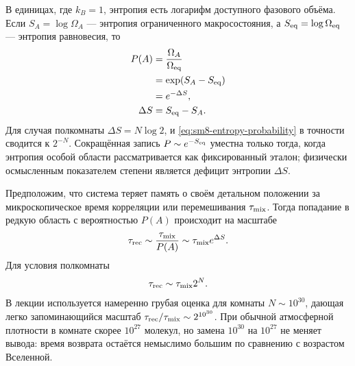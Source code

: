 В единицах, где \(k_B=1\), энтропия есть логарифм доступного фазового объёма. Если \(S_A=\log\Omega_A\) — энтропия ограниченного макросостояния, а \(S_{\rm eq}=\log\Omega_{\rm eq}\) — энтропия равновесия, то
\begin{equation}
 \begin{aligned}
 P(A)
 &=\frac{\Omega_A}{\Omega_{\rm eq}}\\
 &=\exp\!\left(S_A-S_{\rm eq}\right)\\
 &=e^{-\Delta S},\\
 \Delta S&=S_{\rm eq}-S_A.
 \end{aligned}
 \label{eq:sm8-entropy-probability}
\end{equation}
Для случая полкомнаты \(\Delta S=N\log 2\), и
\eqref{eq:sm8-entropy-probability} в точности сводится к \(2^{-N}\).
Сокращённая запись \(P\sim e^{-S_{\rm eq}}\) уместна только тогда, когда энтропия особой области рассматривается как фиксированный эталон; физически осмысленным показателем степени является дефицит энтропии \(\Delta S\).

\begin{classroomqa}
\end{classroomqa}

Предположим, что система теряет память о своём детальном положении за микроскопическое время корреляции или перемешивания \(\tau_{\rm mix}\). Тогда попадание в редкую область с вероятностью \(P(A)\) происходит на масштабе
\begin{equation}
 \tau_{\rm rec}
 \sim \frac{\tau_{\rm mix}}{P(A)}
 \sim \tau_{\rm mix}e^{\Delta S}.
 \label{eq:sm8-recurrence-time-general}
\end{equation}
Для условия полкомнаты
\begin{equation}
 \tau_{\rm rec}\sim\tau_{\rm mix}2^N.
 \label{eq:sm8-recurrence-time-half}
\end{equation}
В лекции используется намеренно грубая оценка для комнаты \(N\sim10^{30}\), дающая легко запоминающийся масштаб
\(\tau_{\rm rec}/\tau_{\rm mix}\sim2^{10^{30}}\). При обычной атмосферной плотности в комнате скорее \(10^{27}\) молекул, но замена \(10^{30}\) на \(10^{27}\) не меняет вывода: время возврата остаётся немыслимо большим по сравнению с возрастом Вселенной.

